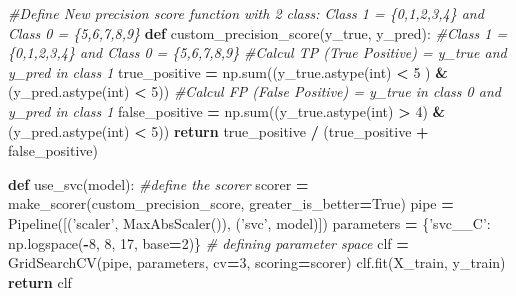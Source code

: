 \documentclass[10pt,a4paper]{article}
\newenvironment{Shaded}{\begin{snugshade}}{\end{snugshade}}
\newcommand{\BuiltInTok}[1]{#1}
\newcommand{\CommentTok}[1]{\textcolor[rgb]{0.56,0.35,0.01}{\textit{#1}}}
\newcommand{\ControlFlowTok}[1]{\textcolor[rgb]{0.13,0.29,0.53}{\textbf{#1}}}
\newcommand{\DecValTok}[1]{\textcolor[rgb]{0.00,0.00,0.81}{#1}}
\newcommand{\KeywordTok}[1]{\textcolor[rgb]{0.13,0.29,0.53}{\textbf{#1}}}
\newcommand{\NormalTok}[1]{#1}
\newcommand{\OperatorTok}[1]{\textcolor[rgb]{0.81,0.36,0.00}{\textbf{#1}}}
\newcommand{\StringTok}[1]{\textcolor[rgb]{0.31,0.60,0.02}{#1}}
\newcommand{\VariableTok}[1]{\textcolor[rgb]{0.00,0.00,0.00}{#1}}
\theoremstyle{break}
\begin{document}
\begin{Shaded}
\begin{Highlighting}[]
\CommentTok{#Define New precision score function with 2 class: Class 1 = \{0,1,2,3,4\} and Class 0 = \{5,6,7,8,9\}}
\KeywordTok{def}\NormalTok{ custom_precision_score(y_true, y_pred):}
    \CommentTok{#Class 1 = \{0,1,2,3,4\} and Class 0 = \{5,6,7,8,9\}}
    \CommentTok{#Calcul TP (True Positive) = y_true and y_pred in class 1}
\NormalTok{    true_positive }\OperatorTok{=}\NormalTok{ np.}\BuiltInTok{sum}\NormalTok{((y_true.astype(}\BuiltInTok{int}\NormalTok{) }\OperatorTok{<} \DecValTok{5}\NormalTok{ ) }\OperatorTok{&}\NormalTok{ (y_pred.astype(}\BuiltInTok{int}\NormalTok{) }\OperatorTok{<} \DecValTok{5}\NormalTok{))}
    \CommentTok{#Calcul FP (False Positive) = y_true in class 0 and y_pred in class 1}
\NormalTok{    false_positive }\OperatorTok{=}\NormalTok{ np.}\BuiltInTok{sum}\NormalTok{((y_true.astype(}\BuiltInTok{int}\NormalTok{) }\OperatorTok{>} \DecValTok{4}\NormalTok{) }\OperatorTok{&}\NormalTok{ (y_pred.astype(}\BuiltInTok{int}\NormalTok{) }\OperatorTok{<} \DecValTok{5}\NormalTok{))}
    \ControlFlowTok{return}\NormalTok{ true_positive }\OperatorTok{/}\NormalTok{ (true_positive }\OperatorTok{+}\NormalTok{ false_positive)}
\end{Highlighting}
\end{Shaded}

\begin{Shaded}
\begin{Highlighting}[]
\KeywordTok{def}\NormalTok{ use_svc(model):}
    \CommentTok{#define the scorer}
\NormalTok{    scorer }\OperatorTok{=}\NormalTok{ make_scorer(custom_precision_score, greater_is_better}\OperatorTok{=}\VariableTok{True}\NormalTok{)}
\NormalTok{    pipe }\OperatorTok{=}\NormalTok{ Pipeline([(}\StringTok{'scaler'}\NormalTok{, MaxAbsScaler()), (}\StringTok{'svc'}\NormalTok{, model)])}
\NormalTok{    parameters }\OperatorTok{=}\NormalTok{ \{}\StringTok{'svc__C'}\NormalTok{: np.logspace(}\OperatorTok{-}\DecValTok{8}\NormalTok{, }\DecValTok{8}\NormalTok{, }\DecValTok{17}\NormalTok{, base}\OperatorTok{=}\DecValTok{2}\NormalTok{)\} }\CommentTok{# defining parameter space}
\NormalTok{    clf }\OperatorTok{=}\NormalTok{ GridSearchCV(pipe, parameters, cv}\OperatorTok{=}\DecValTok{3}\NormalTok{, scoring}\OperatorTok{=}\NormalTok{scorer)}
\NormalTok{    clf.fit(X_train, y_train)}
    \ControlFlowTok{return}\NormalTok{ clf}
\end{Highlighting}
\end{Shaded}
\end{document}
